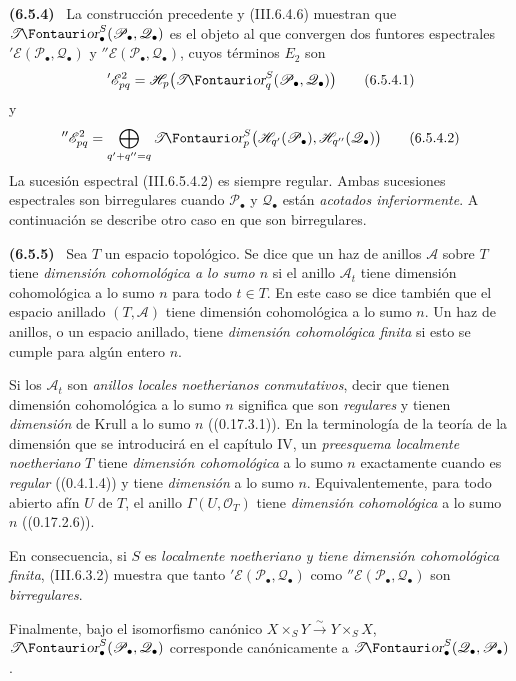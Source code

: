 \documentclass[10pt,oneside]{book}
\makeatletter
\newcommand{\sh}[1]{\mathscr{#1}}
\newcommand*{\ega@sheafop}[3]{\sh{#1}#2\textup{\kern-2.2pt{\Fontauri\slshape #3}}}
\newcommand{\shTor}{\ega@sheafop{T}{}{or}}
\newcommand{\sref}[2][]{\textup{(#2)}}
\newcommand{\oldpage}[2][]{\setcounter{footnote}{0}\marginpar{\scriptsize\textbf{#1}~|~#2}\ignorespaces}
\newenvironment{env}[1][]{\par\medskip\noindent\textbf{(#1)}\ }{\par}
\makeatother
\begin{document}
\begin{env}[6.5.4]
\label{III.6.5.4}
La construcción precedente y \sref{III.6.4.6} muestran que
$\boldsymbol{\shTor}_\bullet^S(\sh P_\bullet,\sh Q_\bullet)$ es el objeto al
que convergen dos funtores espectrales
$'\sh E(\sh P_\bullet,\sh Q_\bullet)$ y
$''\sh E(\sh P_\bullet,\sh Q_\bullet)$, cuyos términos $E_2$ son
\[
  '\sh E_{pq}^2
  =
  \sh H_p\bigl(\shTor_q^S(\sh P_\bullet,\sh Q_\bullet)\bigr)
  \tag{6.5.4.1}\label{III.6.5.4.1}
\]
y
\[
  ''\sh E_{pq}^2
  =
  \bigoplus_{q'+q''=q}
  \shTor_p^S
  \bigl(\sh H_{q'}(\sh P_\bullet),
        \sh H_{q''}(\sh Q_\bullet)\bigr)
  \tag{6.5.4.2}\label{III.6.5.4.2}
\]
La sucesión espectral \sref{III.6.5.4.2} es siempre regular.
Ambas sucesiones espectrales son birregulares cuando
$\sh P_\bullet$ y $\sh Q_\bullet$ están \emph{acotados inferiormente}.
A continuación se describe otro caso en que son birregulares.
\end{env}

\begin{env}[6.5.5]
\label{III.6.5.5}
Sea $T$ un espacio topológico. Se dice que un haz de anillos
$\sh A$ sobre $T$ tiene \emph{dimensión cohomológica a lo sumo
$n$} si el anillo $\sh A_t$ tiene dimensión cohomológica a lo
sumo $n$ para todo $t\in T$. En este caso se dice también que el
espacio anillado $(T,\sh A)$ tiene dimensión cohomológica a lo
sumo $n$. Un haz de anillos, o un espacio anillado, tiene
\emph{dimensión cohomológica finita} si esto se cumple para algún
entero $n$.

Si los $\sh A_t$ son \emph{anillos locales noetherianos conmutativos},
\oldpage[III]{150}
decir que tienen dimensión cohomológica a lo sumo $n$ significa
que son \emph{regulares} y tienen \emph{dimensión} de Krull a lo sumo $n$
(\sref[0]{0.17.3.1}). En la terminología de la teoría de la
dimensión que se introducirá en el capítulo IV, un \emph{preesquema
localmente noetheriano} $T$ tiene \emph{dimensión cohomológica} a lo sumo
$n$ exactamente cuando es \emph{regular} (\sref[0]{0.4.1.4}) y tiene
\emph{dimensión} a lo sumo $n$. Equivalentemente, para todo abierto afín
$U$ de $T$, el anillo $\Gamma(U,\sh O_T)$ tiene \emph{dimensión
cohomológica} a lo sumo $n$ (\sref[0]{0.17.2.6}).

En consecuencia, si $S$ es \emph{localmente noetheriano y tiene
dimensión cohomológica finita}, \sref{III.6.3.2} muestra que tanto
$'\sh E(\sh P_\bullet,\sh Q_\bullet)$ como
$''\sh E(\sh P_\bullet,\sh Q_\bullet)$ son \emph{birregulares}.

Finalmente, bajo el isomorfismo canónico
$X\times_SY\xrightarrow{\sim}Y\times_SX$,
$\boldsymbol{\shTor}_\bullet^S(\sh P_\bullet,\sh Q_\bullet)$ corresponde
canónicamente a
$\boldsymbol{\shTor}_\bullet^S(\sh Q_\bullet,\sh P_\bullet)$.
\end{env}
\end{document}
